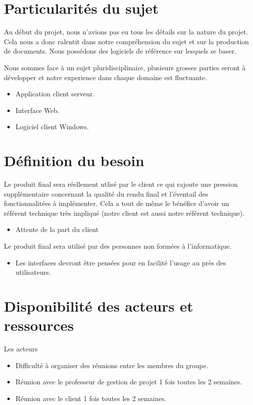 \section{Particularités du sujet}
Au début du projet, nous n'avions pas eu tous les détails sur la nature du projet. Cela nous a donc ralentit
dans notre compréhension du sujet et sur la production de documents.
Nous possédons des logiciels de référence sur lesquels se baser.\\ \newline

Nous sommes face à un sujet pluridisciplinaire, plusieurs grosses parties seront à 
développer et notre experience dans chaque domaine est fluctuante.
\begin{itemize}
	\item Application client serveur.
	\item Interface Web.
	\item Logiciel client Windows.
\end{itemize}

\section{Définition du besoin}

Le produit final sera réellement utlisé par le client ce qui rajoute une pression supplémentaire concernant la qualité 
du rendu final et l'éventail des fonctionnalitées à implémenter. Cela a tout de même le bénéfice d'avoir un référent 
technique très impliqué (notre client est aussi notre référent technique).
\begin{itemize}
	\item Attente de la part du client
\end{itemize}

Le produit final sera utilisé par des personnes non formées à l'informatique. 
\begin{itemize}	
	\item Les interfaces devront être pensées pour en facilité l'usage au près des utilisateurs.\newline
\end{itemize}

\section{Disponibilité des acteurs et ressources}
Les acteurs
\begin{itemize}
	\item Difficulté à organiser des réunions entre les membres du groupe.
	\item Réunion avec le professeur de gestion de projet 1 fois toutes les 2 semaines. 
	\item Réunion avec le client 1 fois toutes les 2 semaines.\newline
\end{itemize}

